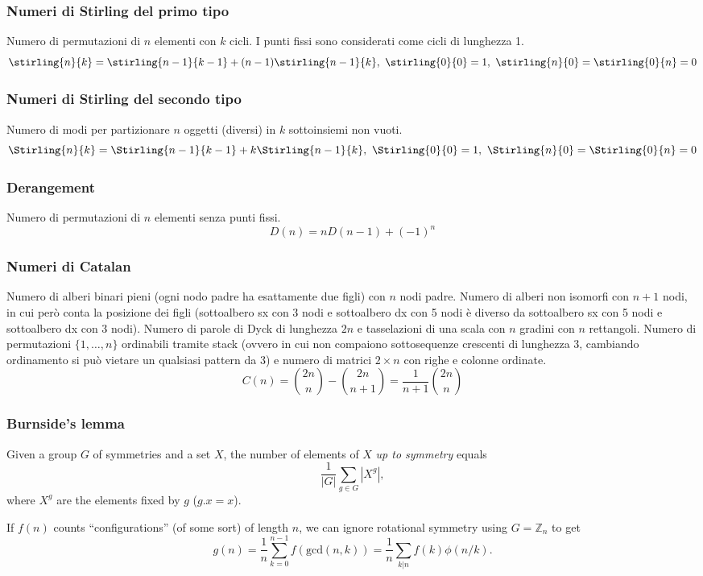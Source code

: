 \subsubsection{Numeri di Stirling del primo tipo}
Numero di permutazioni di $n$ elementi con $k$ cicli. I punti fissi sono considerati come cicli di lunghezza 1.
$$ \stirling{n}{k} = \stirling{n-1}{k-1} + (n-1)\stirling{n-1}{k}, \ \stirling{0}{0}=1, \ \stirling{n}{0}=\stirling{0}{n}=0$$

\subsubsection{Numeri di Stirling del secondo tipo}
Numero di modi per partizionare $n$ oggetti (diversi) in $k$ sottoinsiemi non vuoti.
$$ \Stirling{n}{k} = \Stirling{n-1}{k-1} + k\Stirling{n-1}{k}, \ \Stirling{0}{0}=1,\ \Stirling{n}{0}=\Stirling{0}{n}=0 $$

\subsubsection{Derangement}
Numero di permutazioni di $n$ elementi senza punti fissi.
$$ D(n)=nD(n-1)+(-1)^n $$

\subsubsection{Numeri di Catalan}
Numero di alberi binari pieni (ogni nodo padre ha esattamente due figli) con $n$ nodi padre.
Numero di alberi non isomorfi con $n+1$ nodi, in cui però conta la posizione dei figli (sottoalbero sx con 3 nodi e sottoalbero dx con 5 nodi è diverso da sottoalbero sx con 5 nodi e sottoalbero dx con 3 nodi).
Numero di parole di Dyck di lunghezza $2n$ e tasselazioni di una scala con $n$ gradini con $n$ rettangoli.
Numero di permutazioni $\{1,\dots,n\}$ ordinabili tramite stack (ovvero in cui non compaiono sottosequenze crescenti di lunghezza 3, cambiando ordinamento si può vietare un qualsiasi pattern da 3) e numero di matrici $2\times n$ con righe e colonne ordinate.
$$ C(n)=\binom{2n}{n}-\binom{2n}{n+1}=\frac{1}{n+1}\binom{2n}{n} $$

\subsubsection{Burnside's lemma}
		Given a group $G$ of symmetries and a set $X$, the number of elements of $X$ \emph{up to symmetry} equals
		 \[ {\frac {1}{|G|}}\sum _{{g\in G}}|X^{g}|, \]
		 where $X^{g}$ are the elements fixed by $g$ ($g.x = x$).

		 If $f(n)$ counts ``configurations'' (of some sort) of length $n$, we can ignore rotational symmetry using $G = \mathbb Z_n$ to get
		 \[ g(n) = \frac 1 n \sum_{k=0}^{n-1}{f(\text{gcd}(n, k))} = \frac 1 n \sum_{k|n}{f(k)\phi(n/k)}. \]

